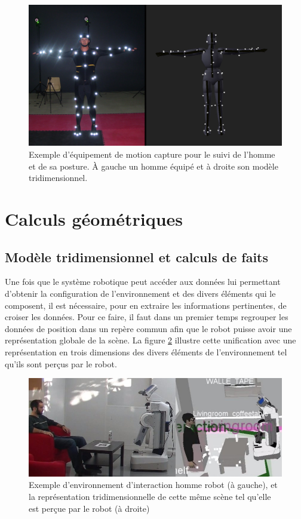 \documentclass[a4paper,11pt,twoside]{StyleThese}
\begin{document}
\begin{figure}[ht!]
 \centering
  \includegraphics[width=0.69\linewidth]{./img/motionCap.jpg} 
  \caption {Exemple d'équipement de motion capture pour le suivi de l'homme et de sa posture. À gauche un homme équipé et à droite son modèle tridimensionnel.}
  \label{fig:mocap}
\end{figure}





\section{Calculs géométriques}
\label{sec:calculs}
\subsection{Modèle tridimensionnel et calculs de faits}
\label{sec:facts}

Une fois que le système robotique peut accéder aux données lui permettant d'obtenir la configuration de l'environnement et des divers éléments qui le composent, il est nécessaire, pour en extraire les informations pertinentes, de croiser les données. Pour ce faire, il faut dans un premier temps regrouper les données de position dans un repère commun afin que le robot puisse avoir une représentation globale de la scène. La figure \ref{fig:real} illustre cette unification avec une représentation en trois dimensions des divers éléments de l'environnement tel qu'ils sont perçus par le robot.

\begin{figure}[ht!]
 \centering
  \includegraphics[width=0.99\linewidth]{./img/real.jpg} 
  \caption {Exemple d'environnement d'interaction homme robot (à gauche), et la représentation tridimensionnelle de cette même scène tel qu'elle est perçue par le robot (à droite)}
  \label{fig:real}
\end{figure}
\end{document}

